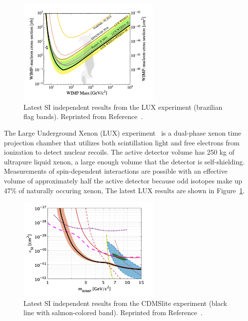 \begin{figure}[htbp]
  \centering
  \includegraphics[width=0.625\textwidth]{DarkMatter/Figures/lux.png}
  \caption{
    Latest SI independent results from the LUX experiment (brazilian flag bands).
    Reprinted from Reference~\cite{LUX2017}. 
  }
  \label{fig:dm_lux}
\end{figure}

The Large Underground Xenon (LUX) experiment~\cite{LUX2017} is a  dual-phase xenon time projection chamber that utilizes both scintillation light and free electrons from ionization to detect nuclear recoils.
The active detector volume has 250 kg of ultrapure liquid xenon, a large enough volume that the detector is self-shielding.
Measurements of spin-dependent interactions are possible with an effective volume of approximately half the active detector because odd isotopes make up 47\% of naturally occuring xenon, 
The latest LUX results are shown in Figure~\ref{fig:dm_lux}.

\begin{figure}[htbp]
  \centering
  \includegraphics[width=0.625\textwidth]{DarkMatter/Figures/cdms.png}
  \caption{
    Latest SI independent results from the CDMSlite experiment (black line with salmon-colored band).
    Reprinted from Reference~\cite{CDMS2016}.
  }
  \label{fig:dm_cdms}
\end{figure}

